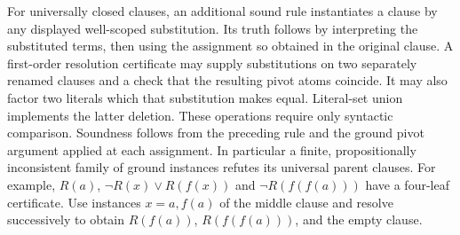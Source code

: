 For universally closed clauses, an additional sound rule instantiates a clause by any displayed well-scoped substitution. Its truth follows by interpreting the substituted terms, then using the assignment so obtained in the original clause. A first-order resolution certificate may supply substitutions on two separately renamed clauses and a check that the resulting pivot atoms coincide. It may also factor two literals which that substitution makes equal. Literal-set union implements the latter deletion. These operations require only syntactic comparison. Soundness follows from the preceding rule and the ground pivot argument applied at each assignment. In particular a finite, propositionally inconsistent family of ground instances refutes its universal parent clauses. For example, $R(a)$, $\neg R(x)\vee R(f(x))$ and $\neg R(f(f(a)))$ have a four-leaf certificate. Use instances $x=a,f(a)$ of the middle clause and resolve successively to obtain $R(f(a))$, $R(f(f(a)))$, and the empty clause.

